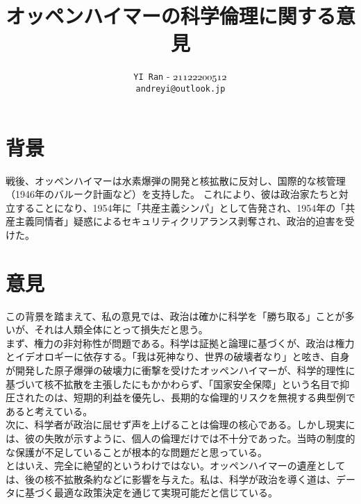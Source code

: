 \documentclass[dvipdfmx]{jarticle}
\title{\vspace{-2cm }\textbf{\Large オッペンハイマーの科学倫理に関する意見}}  %
\author{\texttt{YI Ran} - $\mathnormal{21122200512}$\\ \texttt{andreyi@outlook.jp}}  %
\date{}  %
\theoremstyle{mystyle}
\begin{document}
\maketitle

\section*{背景}
戦後、オッペンハイマーは水素爆弾の開発と核拡散に反対し、国際的な核管理（1946年のバルーク計画など）を支持した。
これにより、彼は政治家たちと対立することになり、1954年に「共産主義シンパ」として告発され、1954年の「共産主義同情者」疑惑によるセキュリティクリアランス剥奪され、政治的迫害を受けた。
\section*{意見}
この背景を踏まえて、私の意見では、政治は確かに科学を「勝ち取る」ことが多いが、それは人類全体にとって損失だと思う。\\
\indent
まず、権力の非対称性が問題である。科学は証拠と論理に基づくが、政治は権力とイデオロギーに依存する。「我は死神なり、世界の破壊者なり」と呟き、自身が開発した原子爆弾の破壊力に衝撃を受けたオッペンハイマーが、科学的理性に基づいて核不拡散を主張したにもかかわらず、「国家安全保障」という名目で抑圧されたのは、短期的利益を優先し、長期的な倫理的リスクを無視する典型例であると考えている。\\
\indent
次に、科学者が政治に屈せず声を上げることは倫理の核心である。しかし現実には、彼の失敗が示すように、個人の倫理だけでは不十分であった。当時の制度的な保護が不足していることが根本的な問題だと思っている。\\
\indent
とはいえ、完全に絶望的というわけではない。オッペンハイマーの遺産としては、後の核不拡散条約などに影響を与えた。私は、科学が政治を導く道は、データに基づく最適な政策決定を通じて実現可能だと信じている。
\end{document}
